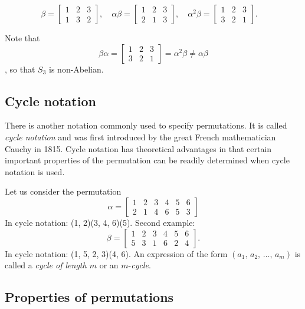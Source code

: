\documentclass[12pt]{article}
\begin{document}
	\[
	\beta = 
	\begin{bmatrix}
		1 & 2 & 3 \\
		1 & 3 & 2 
	\end{bmatrix},\quad
	\alpha\beta =
	\begin{bmatrix}
		1 & 2 & 3 \\
		2 & 1 & 3
	\end{bmatrix},\quad
	\alpha^2\beta = 
	\begin{bmatrix}
		1 & 2 & 3 \\
		3 & 2 & 1 
	\end{bmatrix}.\quad
	\]
	
	Note that
	\[
	\beta\alpha =
	\begin{bmatrix}
		1 & 2 & 3 \\
		3 & 2 & 1	
	\end{bmatrix}
	= \alpha^2\beta \neq \alpha\beta
	\], so that $S_3$ is non-Abelian.
	\newpage
	
	\subsection{Cycle notation}
	There is another notation commonly used to specify permutations. It is called \textit{cycle notation} and was first introduced by the great French mathematician Cauchy in 1815. Cycle notation has theoretical advantages in that certain important properties of the permutation can be readily determined when cycle notation is used.\newline
	
	Let us consider the permutation
	\[
		\alpha = 
		\begin{bmatrix}
			1 & 2 & 3 & 4 & 5 & 6 \\
			2 & 1 & 4 & 6 & 5 & 3
		\end{bmatrix}
	\]
	In cycle notation: (1, 2)(3, 4, 6)(5).\newline
	Second example:
	\[
		\beta = 
		\begin{bmatrix}
			1 & 2 & 3 & 4 & 5 & 6 \\
			5 & 3 & 1 & 6 & 2 & 4
		\end{bmatrix}.
	\]
	In cycle notation: (1, 5, 2, 3)(4, 6).\newline
	An expression of the form $(a_1, \, a_2, \, \dots, \, a_m)$ is called a \textit{cycle of length $m$} or an $m$-\textit{cycle}.
	
	\subsection{Properties of permutations}
\end{document}

